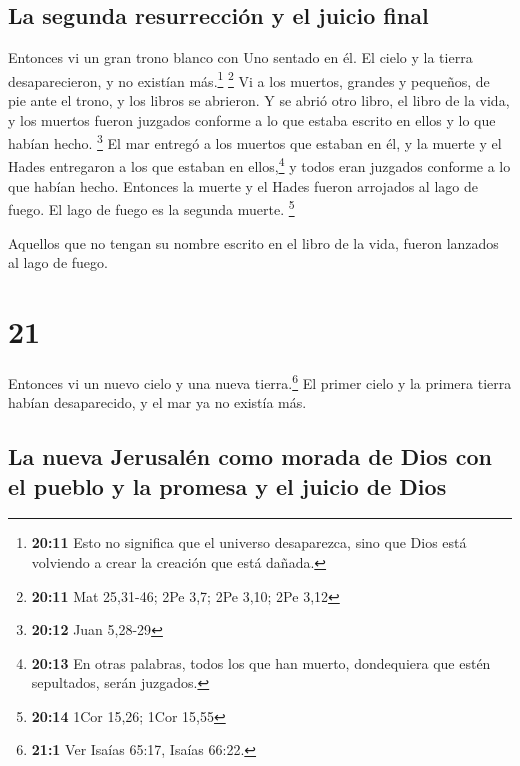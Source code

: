 \hypertarget{la-segunda-resurrecciuxf3n-y-el-juicio-final}{%
\subsection{La segunda resurrección y el juicio
final}\label{la-segunda-resurrecciuxf3n-y-el-juicio-final}}

 Entonces vi un gran trono blanco con Uno sentado en él.
El cielo y la tierra desaparecieron, y no existían más.\footnote{\textbf{20:11}
  Esto no significa que el universo desaparezca, sino que Dios está
  volviendo a crear la creación que está dañada.} \footnote{\textbf{20:11}
  Mat 25,31-46; 2Pe 3,7; 2Pe 3,10; 2Pe 3,12}  Vi a los
muertos, grandes y pequeños, de pie ante el trono, y los libros se
abrieron. Y se abrió otro libro, el libro de la vida, y los muertos
fueron juzgados conforme a lo que estaba escrito en ellos y lo que
habían hecho. \footnote{\textbf{20:12} Juan 5,28-29}  El
mar entregó a los muertos que estaban en él, y la muerte y el Hades
entregaron a los que estaban en ellos,\footnote{\textbf{20:13} En otras
  palabras, todos los que han muerto, dondequiera que estén sepultados,
  serán juzgados.} y todos eran juzgados conforme a lo que habían hecho.
 Entonces la muerte y el Hades fueron arrojados al lago
de fuego. El lago de fuego es la segunda muerte. \footnote{\textbf{20:14}
  1Cor 15,26; 1Cor 15,55}

 Aquellos que no tengan su nombre escrito en el libro de
la vida, fueron lanzados al lago de fuego.

\hypertarget{section-20}{%
\section{21}\label{section-20}}

 Entonces vi un nuevo cielo y una nueva tierra.\footnote{\textbf{21:1}
  Ver Isaías 65:17, Isaías 66:22.} El primer cielo y la primera tierra
habían desaparecido, y el mar ya no existía más.

\hypertarget{la-nueva-jerusaluxe9n-como-morada-de-dios-con-el-pueblo-y-la-promesa-y-el-juicio-de-dios}{%
\subsection{La nueva Jerusalén como morada de Dios con el pueblo y la
promesa y el juicio de
Dios}\label{la-nueva-jerusaluxe9n-como-morada-de-dios-con-el-pueblo-y-la-promesa-y-el-juicio-de-dios}}

